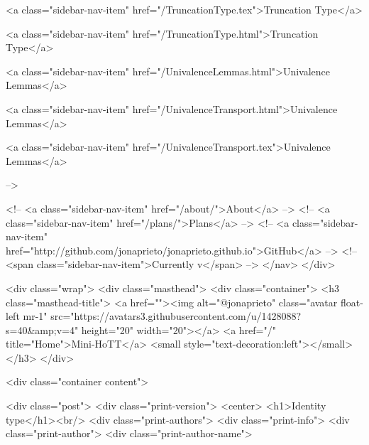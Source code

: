       
    
      
        
          <a class="sidebar-nav-item" href="/TruncationType.tex">Truncation Type</a>
        
      
    
      
        
          <a class="sidebar-nav-item" href="/TruncationType.html">Truncation Type</a>
        
      
    
      
        
          <a class="sidebar-nav-item" href="/UnivalenceLemmas.html">Univalence Lemmas</a>
        
      
    
      
        
          <a class="sidebar-nav-item" href="/UnivalenceTransport.html">Univalence Lemmas</a>
        
      
    
      
        
          <a class="sidebar-nav-item" href="/UnivalenceTransport.tex">Univalence Lemmas</a>
        
      
     -->

    <!-- <a class="sidebar-nav-item" href="/about/">About</a> -->
    <!-- <a class="sidebar-nav-item" href="/plans/">Plans</a> -->
    <!-- <a class="sidebar-nav-item" href="http://github.com/jonaprieto/jonaprieto.github.io">GitHub</a> -->
    <!-- <span class="sidebar-nav-item">Currently v</span> -->
  </nav>
</div>

    <div class="wrap">
      <div class="masthead">
        <div class="container">
          <h3 class="masthead-title">
            <a href=""><img alt="@jonaprieto" class="avatar float-left mr-1" src="https://avatars3.githubusercontent.com/u/1428088?s=40&amp;v=4" height="20" width="20"></a>
            <a href="/" title="Home">Mini-HoTT</a>
            <small style="text-decoration:left"></small>
          </h3>
        </div>
      
      <div class="container content">
        







<div class="post">
  <div class="print-version">
    <center>
      <h1>Identity type</h1><br/>
        <div class="print-authors">
          <div class="print-info">
            <div class="print-author">
              <div class="print-author-name">
                
